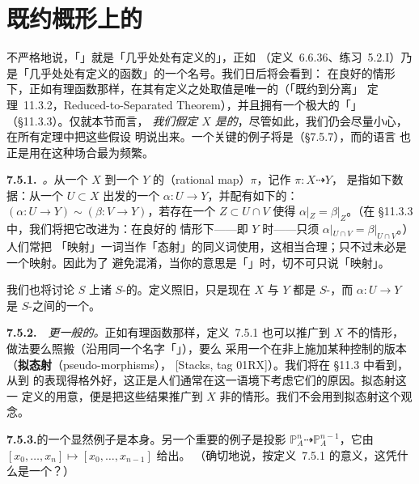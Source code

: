 
\section{既约概形上的\trRationalMap{}}

不严格地说，「\trRationalMap{}」就是「几乎处处有定义的\trMorphism」，正如\trRationalFunction{}%
（定义~6.6.36、练习~5.2.I）乃是「几乎处处有定义的函数」的一个名号。我们日后将会看到：
在良好的情形下，正如有理函数那样，\trRationalMap{}在其有定义之处取值是唯一的（「既约到分离」%
定理~11.3.2，Reduced-to-Separated Theorem），并且拥有一个极大的「\trDomainOfDefinition{}」（\S11.3.3）。仅就本节而言，%
\emph{我们假定 $X$ 是\trReduced{}的}，尽管如此，我们仍会尽量小心，在所有定理中把这些假设%
明说出来。一个关键的例子将是\trIrreducible\trVariety（\S7.5.7），而\trRationalMap{}的语言%
也正是用在这种场合最为频繁。

\textbf{7.5.1.}\ \emph{\trhDefinition{}。}\quad 从一个\trReduced{}\trScheme{} $X$ 到一个%
\trScheme{} $Y$ 的\textbf{\trRationalMap{}}（rational map）$\pi$，记作 $\pi\colon X\dashrightarrow Y$，
是指如下数据：从一个\trDense\trOpenSubset{} $U\subset X$ 出发的一个\trMorphism{}%
$\alpha\colon U\to Y$，并配有如下的\trEquivalenceRelation：%
$(\alpha\colon U\to Y)\sim(\beta\colon V\to Y)$，若存在一个\trDense\trOpenSet{}%
$Z\subset U\cap V$ 使得 $\alpha|_Z=\beta|_Z$。（在 \S11.3.3 中，我们将把它改进为：在良好的%
情形下——即 $Y$ \trSeparated{}时——只须 $\alpha|_{U\cap V}=\beta|_{U\cap V}$。）人们常把%
「映射」一词当作「态射」的同义词使用，这相当合理；只不过\trRationalMap{}未必是一个映射。因此为了%
避免混淆，当你的意思是「\trRationalMap{}」时，切不可只说「映射」。

我们也将讨论\trScheme{} $S$ 上诸 $S$-\trScheme{}的\trRationalMap{}。定义照旧，只是现在 $X$ 与 $Y$ %
都是 $S$-\trScheme，而 $\alpha\colon U\to Y$ 是 $S$-\trScheme{}之间的一个\trMorphism。

\textbf{7.5.2.}\ \hard\ \emph{更一般的\trRationalMap{}。}\quad 正如有理函数那样，定义~7.5.1 %
也可以推广到 $X$ 不\trReduced{}的情形，做法要么照搬（沿用同一个名字「\trRationalMap{}」），要么%
采用一个在非\trReduced\trLocus{}上施加某种控制的版本（\textbf{拟态射}（pseudo-morphisms），
[Stacks, tag 01RX]）。我们将在 \S11.3 中看到，从\trReduced{}\trScheme{}到\trSeparated{}%
\trScheme{}的\trRationalMap{}表现得格外好，这正是人们通常在这一语境下考虑它们的原因。拟态射这一%
定义的用意，便是把这些结果推广到 $X$ 非\trReduced{}的情形。我们不会用到拟态射这个观念。

\textbf{7.5.3.}\quad \trRationalMap{}的一个显然例子是\trMorphism{}本身。另一个重要的例子是投影%
$\mathbb{P}^n_A\dashrightarrow\mathbb{P}^{n-1}_A$，它由 $[x_0,\dots,x_n]\mapsto[x_0,\dots,x_{n-1}]$ 给出。%
（确切地说，按定义~7.5.1 的意义，这凭什么是一个\trRationalMap{}？）

